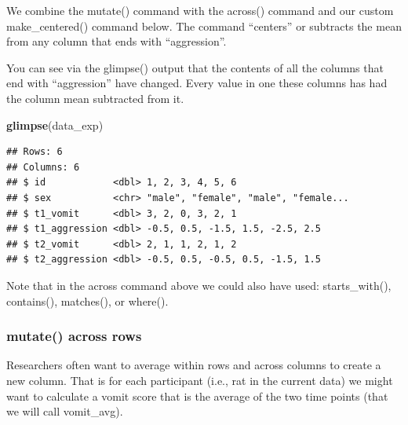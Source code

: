 \documentclass[
]{krantz}
\makeatletter
\newenvironment{Shaded}{\begin{snugshade}}{\end{snugshade}}
\newcommand{\DataTypeTok}[1]{\textcolor[rgb]{0.27,0.27,0.27}{#1}}
\newcommand{\KeywordTok}[1]{\textcolor[rgb]{0.27,0.27,0.27}{\textbf{#1}}}
\newcommand{\NormalTok}[1]{#1}
\newcommand{\OperatorTok}[1]{\textcolor[rgb]{0.43,0.43,0.43}{\textbf{#1}}}
\newcommand{\StringTok}[1]{\textcolor[rgb]{0.5,0.5,0.5}{#1}}
\newenvironment{kframe}{%
\medskip{}
\setlength{\fboxsep}{.8em}
 \def\at@end@of@kframe{}%
 \ifinner\ifhmode%
  \def\at@end@of@kframe{\end{minipage}}%
  \begin{minipage}{\columnwidth}%
 \fi\fi%
 \def\FrameCommand##1{\hskip\@totalleftmargin \hskip-\fboxsep
 \colorbox{shadecolor}{##1}\hskip-\fboxsep
     \hskip-\linewidth \hskip-\@totalleftmargin \hskip\columnwidth}%
 \MakeFramed {\advance\hsize-\width
   \@totalleftmargin\z@ \linewidth\hsize
   \@setminipage}}%
 {\par\unskip\endMakeFramed%
 \at@end@of@kframe}
\renewenvironment{Shaded}{\begin{kframe}}{\end{kframe}}
\makeatother
\begin{document}
We combine the mutate() command with the across() command and our custom make\_centered() command below. The command ``centers'' or subtracts the mean from any column that ends with ``aggression''.

\begin{Shaded}
\end{Shaded}

You can see via the glimpse() output that the contents of all the columns that end with ``aggression'' have changed. Every value in one these columns has had the column mean subtracted from it.

\begin{Shaded}
\begin{Highlighting}[]
\KeywordTok{glimpse}\NormalTok{(data_exp)}
\end{Highlighting}
\end{Shaded}

\begin{verbatim}
## Rows: 6
## Columns: 6
## $ id            <dbl> 1, 2, 3, 4, 5, 6
## $ sex           <chr> "male", "female", "male", "female...
## $ t1_vomit      <dbl> 3, 2, 0, 3, 2, 1
## $ t1_aggression <dbl> -0.5, 0.5, -1.5, 1.5, -2.5, 2.5
## $ t2_vomit      <dbl> 2, 1, 1, 2, 1, 2
## $ t2_aggression <dbl> -0.5, 0.5, -0.5, 0.5, -1.5, 1.5
\end{verbatim}

Note that in the across command above we could also have used: starts\_with(), contains(), matches(), or where().

\hypertarget{mutate-across-rows}{%
\subsubsection{mutate() across rows}\label{mutate-across-rows}}

Researchers often want to average within rows and across columns to create a new column. That is for each participant (i.e., rat in the current data) we might want to calculate a vomit score that is the average of the two time points (that we will call vomit\_avg).
\end{document}
